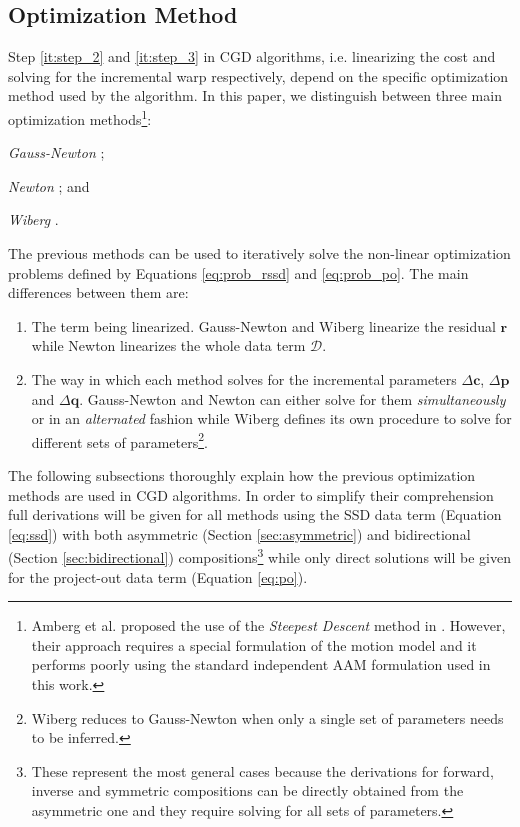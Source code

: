 \subsection{Optimization Method}
\label{sec:optimization}

Step \ref{it:step_2} and \ref{it:step_3} in CGD algorithms, i.e. linearizing the cost and solving for the incremental warp respectively, depend on the specific optimization method used by the algorithm. In this paper, we distinguish between three main optimization methods\footnote{Amberg et al. proposed the use of the \emph{Steepest Descent} method \cite{Boyd2004} in \cite{Amberg2009}. However, their approach requires a special formulation of the motion model and it performs poorly using the standard independent AAM formulation \cite{Matthews2004} used in this work.}:
\begin{inparaenum}
    \item \emph{Gauss-Newton} \cite{Boyd2004, Matthews2004, Gross2005, Martins2010, Papandreou2008, Tzimiropoulos2013};
    \item \emph{Newton} \cite{Boyd2004, Kossaifi2014}; and
    \item \emph{Wiberg} \cite{Okatani2006, Strelow2012, Papandreou2008, Tzimiropoulos2013}.
\end{inparaenum}

The previous methods can be used to iteratively solve the non-linear optimization problems defined by Equations \ref{eq:prob_rssd} and \ref{eq:prob_po}. The main differences between them are:
\begin{enumerate}
    \item The term being linearized. Gauss-Newton and Wiberg linearize the residual $\mathbf{r}$ while Newton linearizes the whole data term $\mathcal{D}$.

    \item The way in which each method solves for the incremental parameters $\Delta \mathbf{c}$, $\Delta \mathbf{p}$ and $\Delta \mathbf{q}$. Gauss-Newton and Newton can either solve for them \emph{simultaneously} or in an \emph{alternated} fashion while Wiberg defines its own procedure to solve for different sets of parameters\footnote{Wiberg reduces to Gauss-Newton when only a single set of parameters needs to be inferred.}.
\end{enumerate}

The following subsections thoroughly explain how the previous optimization methods are used in CGD algorithms. In order to simplify their comprehension full derivations will be given for all methods using the SSD data term (Equation \ref{eq:ssd}) with both asymmetric (Section \ref{sec:asymmetric}) and bidirectional (Section \ref{sec:bidirectional}) compositions\footnote{These represent the most general cases because the derivations for forward, inverse and symmetric compositions can be directly obtained from the asymmetric one and they require solving for all sets of parameters.} while only direct solutions will be given for the project-out data term (Equation \ref{eq:po}).


